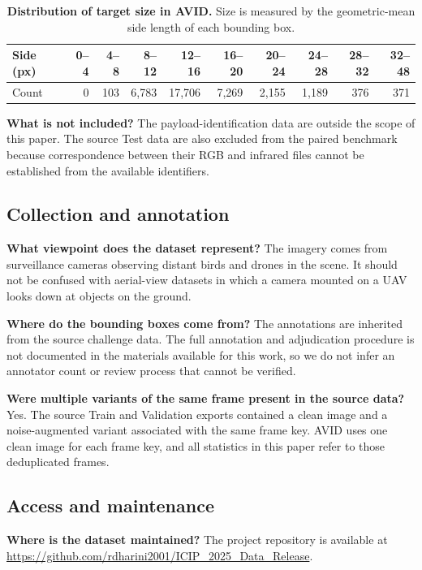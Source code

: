 \documentclass[10pt]{article}
\newcommand{\dataset}{\textsc{AVID}}
\begin{document}
\begin{table}[h]
\centering
\caption{\textbf{Distribution of target size in \dataset{}.}
Size is measured by the geometric-mean side length of each bounding box.}
\label{tab:scalehist}
\small
\begin{tabular}{lrrrrrrrrr}
\toprule
Side (px)
& 0--4 & 4--8 & 8--12 & 12--16 & 16--20
& 20--24 & 24--28 & 28--32 & 32--48 \\
\midrule
Count
& 0 & 103 & 6,783 & 17,706 & 7,269
& 2,155 & 1,189 & 376 & 371 \\
\bottomrule
\end{tabular}
\end{table}

\textbf{What is not included?}
The payload-identification data are outside the scope of this paper. The source Test data are also excluded from the paired benchmark because correspondence between their RGB and infrared files cannot be established from the available identifiers.

\subsection{Collection and annotation}

\textbf{What viewpoint does the dataset represent?}
The imagery comes from surveillance cameras observing distant birds and drones in the scene. It should not be confused with aerial-view datasets in which a camera mounted on a UAV looks down at objects on the ground.

\textbf{Where do the bounding boxes come from?}
The annotations are inherited from the source challenge data. The full annotation and adjudication procedure is not documented in the materials available for this work, so we do not infer an annotator count or review process that cannot be verified.

\textbf{Were multiple variants of the same frame present in the source data?}
Yes. The source Train and Validation exports contained a clean image and a noise-augmented variant associated with the same frame key. \dataset{} uses one clean image for each frame key, and all statistics in this paper refer to those deduplicated frames.

\subsection{Access and maintenance}

\textbf{Where is the dataset maintained?}
The project repository is available at
\url{https://github.com/rdharini2001/ICIP_2025_Data_Release}.
\end{document}
